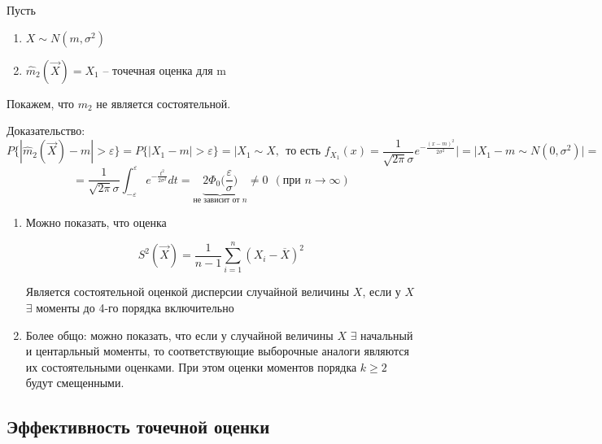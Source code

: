 \begin{example}
Пусть

    \begin{enumerate}
        \item $X\sim N(m,\sigma^2)$
        \item $\hat m_2(\vec X)=X_1$ -- точечная оценка для m
    \end{enumerate}

    Покажем, что $m_2$ не является состоятельной. 
    
    Доказательство:
    \begin{equation*}
        P\{|\hat m_2(\vec X)-m|>\varepsilon\}=P\{|X_1-m|>\varepsilon\}=\bigg|X_1\sim X,~~\text{то есть } f_{X_1}(x)=
        \frac{1}{\sqrt{2\pi }\sigma} e^{-\frac{(x-m)^2}{2\sigma^2}}\bigg|=\bigg|X_1-m\sim N(0,\sigma^2)\bigg|=
    \end{equation*}
    \begin{equation*}
        =\frac{1}{\sqrt{2\pi }\sigma} \int^\varepsilon_{-\varepsilon}e^{-\frac{t^2}{2\sigma^2}}dt=\underbrace{2\Phi_0\bigg(\frac{\varepsilon}{\sigma}\bigg)}_{\text{не зависит от } n}\ne 0 ~~(\text{при } n \to \infty)
    \end{equation*}

\end{example}

\begin{note}
    \begin{enumerate}
        \item Можно показать, что оценка

            \begin{equation*}
                S^2 (\vec X) = \frac{1}{n-1} \sum_{i=1}^n (X_i -
                \overline X)^2
            \end{equation*}

            Является состоятельной оценкой дисперсии случайной величины $X$,
            если у $X$ $\exists$ моменты до 4-го порядка включительно

        \item Более общо: можно показать, что если у случайной величины $X$
            $\exists$ начальный и центарльный моменты, то соответствующие
            выборочные аналоги являются их состоятельными оценками.
            При этом оценки моментов порядка $k \geq 2$ будут
            смещенными.
    \end{enumerate}
\end{note}

\subsection{Эффективность точечной оценки}

